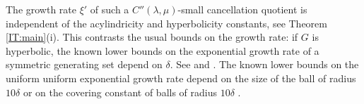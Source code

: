 \documentclass[leqno,a4paper,10pt]{amsart}
\theoremstyle{plain}
\newtheorem{thm}{Theorem}[section]
\theoremstyle{definition}
\newtheorem{rem}[thm]{Remark}
\theoremstyle{remark}
\let\ge\geqslant
\begin{document}
 The growth rate $\xi'$ of such a $C''(\lambda,\mu)$-small cancellation quotient is independent of the acylindricity and hyperbolicity constants, see Theorem \ref{IT:main}(i). 
 This contrasts the usual bounds on the growth rate: if $G$ is hyperbolic, the known lower bounds on the exponential growth rate of a symmetric generating set depend on $\delta$. See \cite[Theorem 1.14]{breuillard_joint_2021} and \cite[Corollary 1.4]{besson_curvaturefree_2020}. The known lower bounds on the uniform uniform exponential growth rate depend  on the size of the ball of radius $10\delta$ \cite{koubi_croissance_1998,arzhantseva_lower_2006} or on the covering constant of balls of radius $10\delta$ \cite[Theorem 1.13]{breuillard_joint_2021}.


\end{document}
